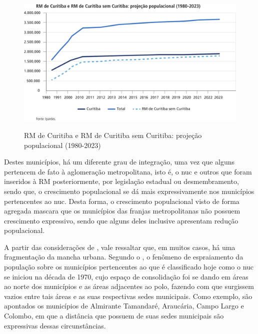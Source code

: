 	\begin{figure}
		\centering
		\caption{RM de Curitiba e RM de Curitiba sem Curitiba: projeção populacional (1980-2023)}
		\includegraphics[width=1.0\linewidth]{img/costa2015a_02}
		\label{fig:costa2015a_02}
	\end{figure}
	
	Destes municípios, há um diferente grau de integração, uma vez que alguns pertencem de fato à aglomeração metropolitana, isto é, o \gls{nuc} e outros que foram inseridos à RM posteriormente, por legislação estadual ou desmembramento, sendo que, o crescimento populacional se dá mais expressivamente nos municípios pertencentes ao \gls{nuc}. Desta forma, o crescimento populacional visto de forma agregada mascara que os municípios das franjas metropolitanas não possuem crescimento expressivo, sendo que alguns deles inclusive apresentam redução populacional.
	
	A partir das considerações de , vale ressaltar que, em muitos casos, há uma fragmentação da mancha urbana. Segundo o \cite{ipardes2006a}, o fenômeno de espraiamento da população sobre os municípios pertencentes ao que é classificado hoje como o \gls{nuc} se iniciou na década de 1970, cujo espaço de consolidação foi se dando em áreas ao norte dos municípios e as áreas adjacentes ao polo, fazendo com que surgissem vazios entre tais áreas e as suas respectivas sedes municipais. Como exemplo, são apontados os municípios de Almirante Tamandaré, Araucária, Campo Largo e Colombo, em que a distância que possuem de suas sedes municipais são expressivas dessas circunstâncias.
	

